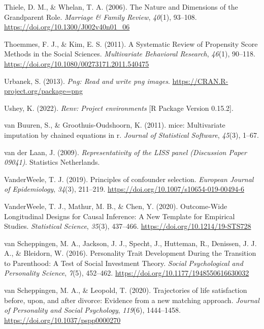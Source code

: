 \documentclass[
  english,
  man,floatsintext]{apa7}
\begin{document}
\leavevmode\hypertarget{ref-thieleNatureDimensionsGrandparent2006a}{}%
Thiele, D. M., \& Whelan, T. A. (2006). The Nature and Dimensions of the Grandparent Role. \emph{Marriage \& Family Review}, \emph{40}(1), 93--108. \url{https://doi.org/10.1300/J002v40n01_06}

\leavevmode\hypertarget{ref-thoemmesSystematicReviewPropensity2011}{}%
Thoemmes, F. J., \& Kim, E. S. (2011). A Systematic Review of Propensity Score Methods in the Social Sciences. \emph{Multivariate Behavioral Research}, \emph{46}(1), 90--118. \url{https://doi.org/10.1080/00273171.2011.540475}

\leavevmode\hypertarget{ref-R-png}{}%
Urbanek, S. (2013). \emph{Png: Read and write png images}. \url{https://CRAN.R-project.org/package=png}

\leavevmode\hypertarget{ref-R-renv}{}%
Ushey, K. (2022). \emph{Renv: Project environments} {[}R Package Version 0.15.2{]}.

\leavevmode\hypertarget{ref-mice2011}{}%
van Buuren, S., \& Groothuis-Oudshoorn, K. (2011). mice: Multivariate imputation by chained equations in r. \emph{Journal of Statistical Software}, \emph{45}(3), 1--67.

\leavevmode\hypertarget{ref-vanderlaanRepresentativityLISSPanel2009}{}%
van der Laan, J. (2009). \emph{Representativity of the LISS panel (Discussion Paper 09041)}. Statistics Netherlands.

\leavevmode\hypertarget{ref-vanderweelePrinciplesConfounderSelection2019}{}%
VanderWeele, T. J. (2019). Principles of confounder selection. \emph{European Journal of Epidemiology}, \emph{34}(3), 211--219. \url{https://doi.org/10.1007/s10654-019-00494-6}

\leavevmode\hypertarget{ref-vanderweeleOutcomeWideLongitudinalDesigns2020}{}%
VanderWeele, T. J., Mathur, M. B., \& Chen, Y. (2020). Outcome-Wide Longitudinal Designs for Causal Inference: A New Template for Empirical Studies. \emph{Statistical Science}, \emph{35}(3), 437--466. \url{https://doi.org/10.1214/19-STS728}

\leavevmode\hypertarget{ref-vanscheppingenPersonalityTraitDevelopment2016}{}%
van Scheppingen, M. A., Jackson, J. J., Specht, J., Hutteman, R., Denissen, J. J. A., \& Bleidorn, W. (2016). Personality Trait Development During the Transition to Parenthood: A Test of Social Investment Theory. \emph{Social Psychological and Personality Science}, \emph{7}(5), 452--462. \url{https://doi.org/10.1177/1948550616630032}

\leavevmode\hypertarget{ref-vanscheppingenTrajectoriesLifeSatisfaction2020}{}%
van Scheppingen, M. A., \& Leopold, T. (2020). Trajectories of life satisfaction before, upon, and after divorce: Evidence from a new matching approach. \emph{Journal of Personality and Social Psychology}, \emph{119}(6), 1444--1458. \url{https://doi.org/10.1037/pspp0000270}
\end{document}
